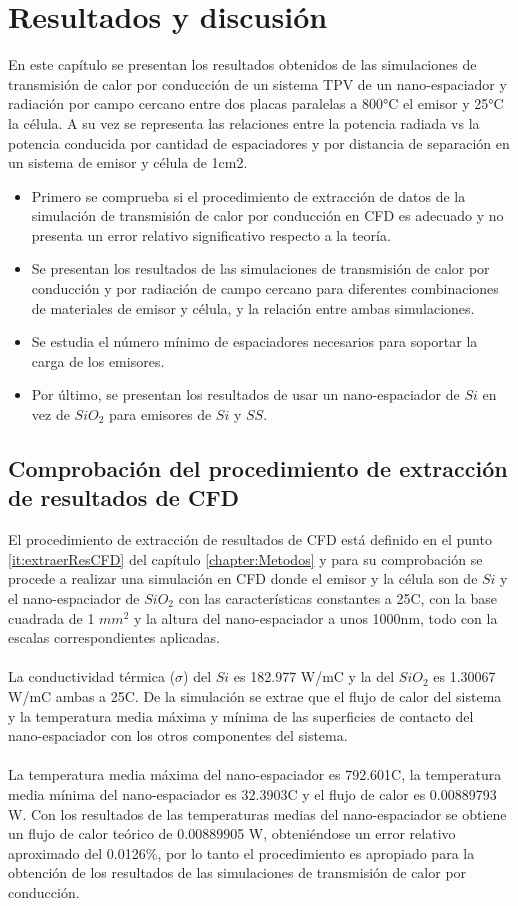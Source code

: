 \chapter{Resultados y discusión}
En este capítulo se presentan los resultados obtenidos de las simulaciones de transmisión de calor por conducción de un sistema TPV de un nano-espaciador y
radiación por campo cercano entre dos placas paralelas a 800°C el emisor y 25°C la célula. A su vez se representa las relaciones entre la potencia radiada vs la potencia conducida por cantidad de espaciadores y por distancia de separación en un sistema de emisor y célula de 1cm2.
\begin{itemize}
	\item Primero se comprueba si el procedimiento de extracción de datos de la simulación de transmisión de calor por conducción en CFD es adecuado y no presenta un error relativo significativo respecto a la teoría.
	\item Se presentan los resultados de las simulaciones de transmisión de calor por conducción y por radiación de campo cercano para diferentes combinaciones de materiales de emisor y célula, y la relación entre ambas simulaciones.
	\item Se estudia el número mínimo de espaciadores necesarios para soportar la carga de los emisores.
	\item Por último, se presentan los resultados de usar un nano-espaciador de $Si$ en vez de $SiO_2$ para emisores de $Si$ y $SS$.
\end{itemize}
\section{Comprobación del procedimiento de extracción de resultados de CFD}
El procedimiento de extracción de resultados de CFD está definido en el punto \ref{it:extraerResCFD} del capítulo \ref{chapter:Metodos} y para su comprobación se procede a realizar una simulación en CFD donde el emisor y la célula son de $Si$ y el nano-espaciador de $SiO_2$ con las características constantes a 25\textdegree C, con la base cuadrada de 1 $mm^2$ y la altura del nano-espaciador a unos 1000nm, todo con la escalas correspondientes aplicadas.\\\\
La conductividad térmica ($\sigma$) del $Si$ es 182.977 W/m\textdegree C y la del $SiO_2$ es 1.30067 W/m\textdegree C ambas a 25\textdegree C. De la simulación se extrae que el flujo de calor del sistema y la temperatura media máxima y mínima de las superficies de contacto del nano-espaciador con los otros componentes del sistema.\\\\
La temperatura media máxima del nano-espaciador es 792.601\textdegree C, la temperatura media mínima del nano-espaciador es 32.3903\textdegree C y el flujo de calor es 0.00889793 W. Con los resultados de las temperaturas medias del nano-espaciador se obtiene un flujo de calor teórico de 0.00889905 W, obteniéndose un error relativo aproximado del 0.0126\%, por lo tanto el procedimiento es apropiado para la obtención de los resultados de las simulaciones de transmisión de calor por conducción.

